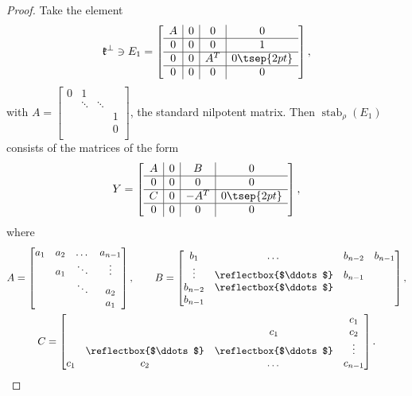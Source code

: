 \documentclass[pdftex]{sigma}
\numberwithin{equation}{section}
\begin{document}
\begin{proof}
Take the element
\begin{gather*} \mathfrak{k}^\perp \ni E_1 =
\left[
\begin{array}{c|c|c|c}
A & 0 & 0 & 0 \\ \hline
0 & 0 & 0 & 1 \\ \hline
0 & 0 & A^T & 0 \tsep{2pt}\\ \hline
0 & 0 & 0 & 0
\end{array}
\right],\end{gather*} with $A= \left[ \begin{smallmatrix}
0		&	1		&	 			&					\\
&	\ddots	& 	\ddots		&					 \\
&			& 				&			1	 \\
&			&				&			0	 \\
\end{smallmatrix} \right] $, the standard nilpotent matrix.
Then $\operatorname{stab}_{\rho}(E_1)$ consists of the matrices of the form
\begin{gather*}
Y=\left[ \begin{array}{c|c|c|c}
A & 0 & B & 0 \\ \hline
0 & 0 & 0 & 0 \\ \hline
C & 0 & -A^T & 0 \tsep{2pt}\\ \hline
0 & 0 & 0 & 0
\end{array} \right],\end{gather*}
 where
 \begin{gather*} A=\left[\begin{matrix}
a_1 & a_2 & \dots & a_{n-1} \\
& a_1 & \ddots & \vdots \\
& & \ddots & a_2 \\
& & & a_1
\end{matrix}\right],\qquad B=\left[ \begin{matrix}
b_1 & \dots & b_{n-2} & b_{n-1} \\
\vdots & \reflectbox{$\ddots$} & b_{n-1} & \\
b_{n-2} & \reflectbox{$\ddots$} & & \\
b_{n-1} & & &
\end{matrix} \right] ,\\ C=\left[ \begin{matrix}
& & & c_1 \\
& & c_1 & c_2 \\
& \reflectbox{$\ddots$} & \reflectbox{$\ddots$} & \vdots \\
c_1 & c_2 & \dots & c_{n-1}
\end{matrix} \right] .

\end{gather*}
\end{proof}
\end{document}
